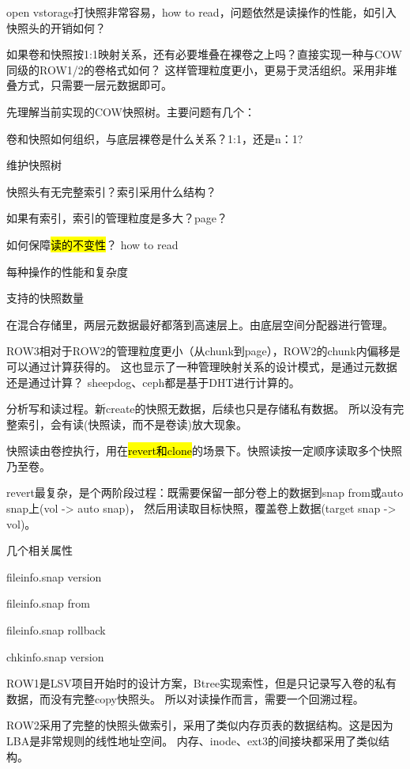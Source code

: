 open vstorage打快照非常容易，how to read，问题依然是读操作的性能，如引入快照头的开销如何？

如果卷和快照按1:1映射关系，还有必要堆叠在裸卷之上吗？直接实现一种与COW同级的ROW1/2的卷格式如何？
这样管理粒度更小，更易于灵活组织。采用非堆叠方式，只需要一层元数据即可。

先理解当前实现的COW快照树。主要问题有几个：
\begin{enumbox}
\item 卷和快照如何组织，与底层裸卷是什么关系？1:1，还是n：1?
\item 维护快照树
\item 快照头有无完整索引？索引采用什么结构？
\item 如果有索引，索引的管理粒度是多大？page？
\item 如何保障\hl{读的不变性}？ how to read
\item 每种操作的性能和复杂度
\item 支持的快照数量
\end{enumbox}

在混合存储里，两层元数据最好都落到高速层上。由底层空间分配器进行管理。

ROW3相对于ROW2的管理粒度更小（从chunk到page），ROW2的chunk内偏移是可以通过计算获得的。
这也显示了一种管理映射关系的设计模式，{是通过元数据还是通过计算}？
sheepdog、ceph都是基于DHT进行计算的。

分析写和读过程。新create的快照无数据，后续也只是存储私有数据。
所以没有完整索引，会有读(快照读，而不是卷读)放大现象。

快照读由卷控执行，用在\hl{revert和clone}的场景下。快照读按一定顺序读取多个快照乃至卷。

revert最复杂，是个两阶段过程：既需要保留一部分卷上的数据到snap from或auto snap上(vol -> auto snap)，
然后用读取目标快照，覆盖卷上数据(target snap -> vol)。

几个相关属性
\begin{enumbox}
\item fileinfo.snap version
\item fileinfo.snap from
\item fileinfo.snap rollback
\item chkinfo.snap version
\end{enumbox}

\hrulefill

ROW1是LSV项目开始时的设计方案，Btree实现索性，但是只记录写入卷的私有数据，而没有完整copy快照头。
所以对读操作而言，需要一个回溯过程。

ROW2采用了完整的快照头做索引，采用了类似内存页表的数据结构。这是因为LBA是非常规则的线性地址空间。
内存、inode、ext3的间接块都采用了类似结构。


